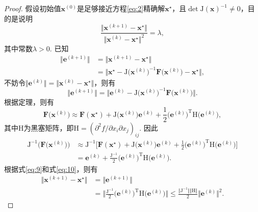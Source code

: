 \documentclass[cn,12pt,founder,a4paper]{elegantpaper}
\newcommand*{\transpose}{\mathrm{T}}
\newcommand*{\J}{\b{\mathrm{J}}}
\renewcommand*{\H}{\b{\mathrm{H}}}
\renewcommand*{\b}{\boldsymbol}
\begin{document}
\begin{proof}
  假设初始值\(\b{x}^{(0)}\)是足够接近方程\eqref{eq:2}精确解\(\b{x}^\star\)，且\(\det\J(\b{x})^{-1}\ne 0\)，目的是说明
  \[\frac{\Vert\b{x}^{(k+1)}-\b{x}^\star\Vert}{\Vert\b{x}^{(k)}-\b{x}^\star\Vert^2}=\lambda,\]
  其中常数\(\lambda>0\).
  已知
  \begin{align*}
    \big\Vert\b{e}^{(k+1)}\big\Vert&=\big\Vert\b{x}^{(k+1)}-\b{x}^{\star}\big\Vert\\
    &=\big\Vert\b{x}^\star-\J\big(\b{x}^{(k)}\big)^{-1}\b{F}\big(\b{x}^{(k)}\big)-\b{x}^{\star}\big\Vert,
  \end{align*}
  不妨令\(\big\Vert\b{e}^{(k)}\big\Vert=\big\Vert\b{x}^{(k)}-\b{x}^\star\big\Vert\)，则有
  \begin{equation}\label{eq:9}
    \big\Vert\b{e}^{(k+1)}\big\Vert=\big\Vert\b{e}^{(k)}-\J\big(\b{x}^{(k)}\big)^{-1}\b{F}\big(\b{x}^{(k)}\big)\big\Vert.
  \end{equation}
  根据定理，则有
  \[\b{F}\big(\b{x}^{(k)}\big)\approx\b{F}(\b{x}^\star)+\J\big(\b{x}^{(k)}\big)\b{e}^{(k)}+\frac{1}{2}\big(\b{e}^{(k)}\big)^\transpose\H\big(\b{e}^{(k)}\big),\]
  其中\(\H\)为黑塞矩阵，即\(\H=({\partial^2 f}/{\partial x_i\partial x_j})_{ij}\).
  因此
  \begin{equation}\label{eq:10}
    \begin{aligned}
      \J^{-1}\big(\b{F}\big(\b{x}^{(k)}\big)\big)&\approx\J^{-1}\Big[\b{F}(\b{x}^\star)+\J\big(\b{x}^{(k)}\big)\b{e}^{(k)}+\frac{1}{2}\big(\b{e}^{(k)}\big)^\transpose\H\big(\b{e}^{(k)}\big)\Big]\\
      &=\b{e}^{(k)}+\frac{\J^{-1}}{2}\big(\b{e}^{(k)}\big)^\transpose\H\big(\b{e}^{(k)}\big).
    \end{aligned}
  \end{equation}
  根据式\eqref{eq:9}和式\eqref{eq:10}，则有
  \begin{align*}
    \big\Vert\b{x}^{(k+1)}-\b{x}^\star\big\Vert&=\big\Vert\b{e}^{(k+1)}\big\Vert\\
    &=\Big\Vert\frac{\J^{-1}}{2}\big(\b{e}^{(k)}\big)^\transpose\H\big(\b{e}^{(k)}\big)\Big\Vert\leqslant\frac{\Vert\J^{-1}\Vert\Vert\H\Vert}{2}\big\Vert\b{e}^{(k)}\big\Vert^2.
  \end{align*}
\end{proof}
\end{document}
